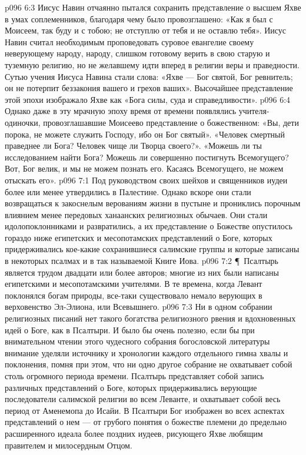 \vs p096 6:3 Иисус Навин отчаянно пытался сохранить представление о высшем Яхве в умах соплеменников, благодаря чему было провозглашено: «Как я был с Моисеем, так буду и с тобою; не отступлю от тебя и не оставлю тебя». Иисус Навин считал необходимым проповедовать суровое евангелие своему неверующему народу, народу, слишком готовому верить в свою старую и туземную религию, но не желавшему идти вперед в религии веры и праведности. Сутью учения Иисуса Навина стали слова: «Яхве --- Бог святой, Бог ревнитель; он не потерпит беззакония вашего и грехов ваших». Высочайшее представление этой эпохи изображало Яхве как «Бога силы, суда и справедливости».
\vs p096 6:4 Однако даже в эту мрачную эпоху время от времени появлялись учителя\hyp{}одиночки, провозглашавшие Моисеево представление о божественном: «Вы, дети порока, не можете служить Господу, ибо он Бог святый». «Человек смертный праведнее ли Бога? Человек чище ли Творца своего?». «Можешь ли ты исследованием найти Бога? Можешь ли совершенно постигнуть Всемогущего? Вот, Бог велик, и мы не можем познать его. Касаясь Всемогущего, не можем отыскать его».
\vs p096 7:1 Под руководством своих шейхов и священников иудеи более или менее утвердились в Палестине. Однако вскоре они стали возвращаться к закоснелым верованиям жизни в пустыне и прониклись порочным влиянием менее передовых ханаанских религиозных обычаев. Они стали идолопоклонниками и развратились, а их представление о Божестве опустилось гораздо ниже египетских и месопотамских представлений о Боге, которых придерживались кое\hyp{}какие сохранившиеся салимские группы и которые записаны в некоторых псалмах и в так называемой Книге Иова.
\vs p096 7:2 \P\ Псалтырь является трудом двадцати или более авторов; многие из них были написаны египетскими и месопотамскими учителями. В те времена, когда Левант поклонялся богам природы, все\hyp{}таки существовало немало верующих в верховенство Эл\hyp{}Элиона, или Всевышнего.
\vs p096 7:3 Ни в одном собрании религиозных писаний нет такого богатства религиозного рвения и вдохновенных идей о Боге, как в Псалтыри. И было бы очень полезно, если бы при внимательном чтении этого чудесного собрания богословской литературы внимание уделяли источнику и хронологии каждого отдельного гимна хвалы и поклонения, помня при этом, что ни одно другое собрание не охватывает собой столь огромного периода времени. Псалтырь представляет собой запись различных представлений о Боге, которых придерживались верующие последователи салимской религии во всем Леванте, и охватывает собой весь период от Аменемопа до Исайи. В Псалтыри Бог изображен во всех аспектах представлений о нем --- от грубого понятия о божестве племени до предельно расширенного идеала более поздних иудеев, рисующего Яхве любящим правителем и милосердным Отцом.
